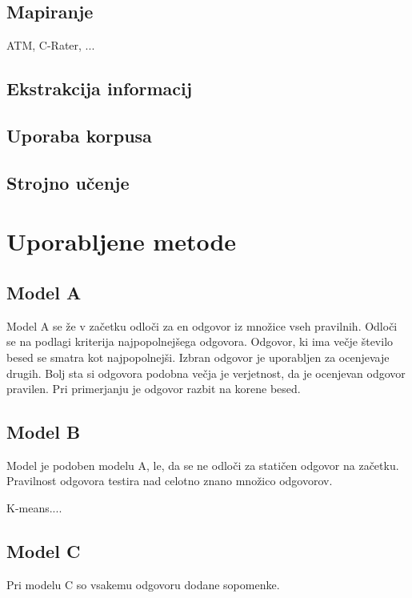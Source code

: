 \documentclass[journal]{IEEEtran}
\begin{document}
\subsection{Mapiranje}
ATM, C-Rater, ...

\subsection{Ekstrakcija informacij}

\subsection{Uporaba korpusa}

\subsection{Strojno učenje}

\section{Uporabljene metode}
\subsection{Model A}
Model A se že v začetku odloči za en odgovor iz množice vseh pravilnih. Odloči se na podlagi kriterija najpopolnejšega odgovora. Odgovor, ki ima večje število besed se smatra kot najpopolnejši.
Izbran odgovor je uporabljen za ocenjevaje drugih. Bolj sta si odgovora podobna večja je verjetnost, da je ocenjevan odgovor pravilen. Pri primerjanju je odgovor razbit na korene besed.

\subsection{Model B}
Model je podoben modelu A, le, da se ne odloči za statičen odgovor na začetku. Pravilnost odgovora testira nad celotno znano množico odgovorov.

K-means....

\subsection{Model C}
Pri modelu C so vsakemu odgovoru dodane sopomenke. 
\end{document}
